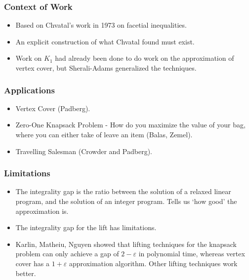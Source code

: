\documentclass{beamer}
\begin{document}
\begin{frame}
    \frametitle{Context of Work}

    \begin{itemize}
        \item Based on Chvatal's work in 1973 on facetial inequalities.
        \item An explicit construction of what Chvatal found must exist.
        \item Work on $K_1$ had already been done to do work on the approximation of vertex cover, but Sherali-Adams generalized the techniques.
    \end{itemize}
\end{frame}

\begin{frame}
    \frametitle{Applications}

    \begin{itemize}
        \item Vertex Cover (Padberg).
        \item Zero-One Knapsack Problem - How do you maximize the value of your bag, where you can either take of leave an item (Balas, Zemel).
        \item Travelling Salesman (Crowder and Padberg).
    \end{itemize}
\end{frame}

\begin{frame}
    \frametitle{Limitations}

    \begin{itemize}
        \item The integrality gap is the ratio between the solution of a relaxed linear program, and the solution of an integer program. Tells us `how good' the approximation is.
        \item The integrality gap for the lift has limitations.
        \item Karlin, Matheiu, Nguyen showed that lifting techniques for the knapsack problem can only achieve a gap of $2 - \varepsilon$ in polynomial time, whereas vertex cover has a $1 + \varepsilon$ approximation algorithm. Other lifting techniques work better.
    \end{itemize}
\end{frame}
\end{document}
